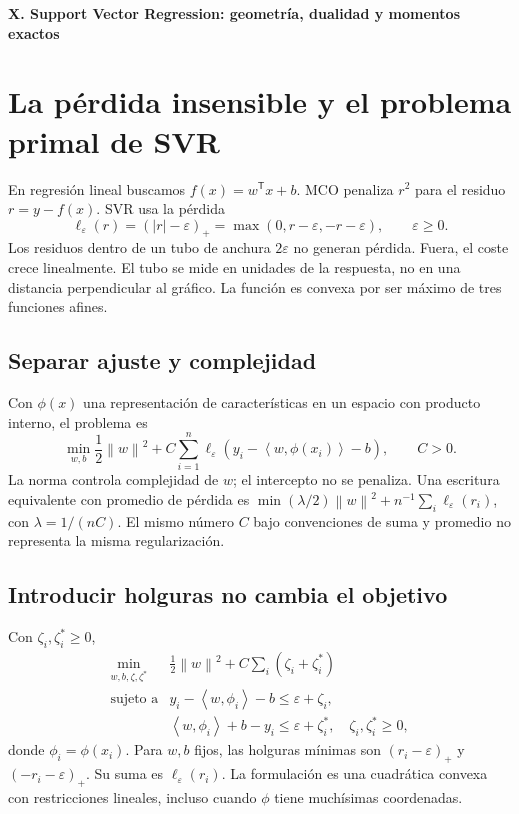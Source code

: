 \documentclass[11pt,a4paper]{article}
\newcommand{\T}{^{\mathsf T}}
\newcommand{\norm}[1]{\left\lVert #1\right\rVert}
\newcommand{\ip}[2]{\left\langle #1,#2\right\rangle}
\theoremstyle{definition}
\newcommand{\parte}[1]{\par\bigskip\Needspace{8\baselineskip}\begin{center}{\Large\bfseries\color{azul}#1}\end{center}}
\begin{document}
\parte{X. Support Vector Regression: geometría, dualidad y momentos exactos}
\section{La pérdida insensible y el problema primal de SVR}
En regresión lineal buscamos $f(x)=w\T x+b$. MCO penaliza $r^2$ para el residuo $r=y-f(x)$. SVR usa la pérdida
\[
\ell_\varepsilon(r)=(|r|-\varepsilon)_+=\max(0,r-\varepsilon,-r-\varepsilon),\qquad\varepsilon\ge0.
\]
Los residuos dentro de un tubo de anchura $2\varepsilon$ no generan pérdida. Fuera, el coste crece linealmente. El tubo se mide en unidades de la respuesta, no en una distancia perpendicular al gráfico. La función es convexa por ser máximo de tres funciones afines.
\subsection{Separar ajuste y complejidad}
Con $\phi(x)$ una representación de características en un espacio con producto interno, el problema es
\[
\min_{w,b}\frac12\norm w^2+C\sum_{i=1}^n
\ell_\varepsilon(y_i-\ip w{\phi(x_i)}-b),\qquad C>0.
\]
La norma controla complejidad de $w$; el intercepto no se penaliza. Una escritura equivalente con promedio de pérdida es $\min(\lambda/2)\norm w^2+n^{-1}\sum_i\ell_\varepsilon(r_i)$, con $\lambda=1/(nC)$. El mismo número $C$ bajo convenciones de suma y promedio no representa la misma regularización.
\subsection{Introducir holguras no cambia el objetivo}
Con $\zeta_i,\zeta_i^*\ge0$,
\[
\begin{array}{ll}
\displaystyle\min_{w,b,\zeta,\zeta^*}&\displaystyle\frac12\norm w^2+C\sum_i(\zeta_i+\zeta_i^*)\\[3pt]
\text{sujeto a}& y_i-\ip w{\phi_i}-b\le\varepsilon+\zeta_i,\\
&\ip w{\phi_i}+b-y_i\le\varepsilon+\zeta_i^*,\quad\zeta_i,\zeta_i^*\ge0,
\end{array}
\]
donde $\phi_i=\phi(x_i)$. Para $w,b$ fijos, las holguras mínimas son $(r_i-\varepsilon)_+$ y $(-r_i-\varepsilon)_+$. Su suma es $\ell_\varepsilon(r_i)$. La formulación es una cuadrática convexa con restricciones lineales, incluso cuando $\phi$ tiene muchísimas coordenadas.
\end{document}
